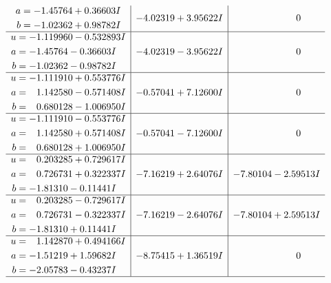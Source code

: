 \documentclass[1p]{elsarticle_modified}
\theoremstyle{definition}
\begin{document}
$$\begin{array}{c|c|c}
\begin{aligned}
a &= -1.45764 + 0.36603 I \\
b &= -1.02362 + 0.98782 I\end{aligned}
 & -4.02319 + 3.95622 I & \phantom{-0.000000 } 0 \\ \hline\begin{aligned}
u &= -1.119960 - 0.532893 I \\
a &= -1.45764 - 0.36603 I \\
b &= -1.02362 - 0.98782 I\end{aligned}
 & -4.02319 - 3.95622 I & \phantom{-0.000000 } 0 \\ \hline\begin{aligned}
u &= -1.111910 + 0.553776 I \\
a &= \phantom{-}1.142580 - 0.571408 I \\
b &= \phantom{-}0.680128 - 1.006950 I\end{aligned}
 & -0.57041 + 7.12600 I & \phantom{-0.000000 } 0 \\ \hline\begin{aligned}
u &= -1.111910 - 0.553776 I \\
a &= \phantom{-}1.142580 + 0.571408 I \\
b &= \phantom{-}0.680128 + 1.006950 I\end{aligned}
 & -0.57041 - 7.12600 I & \phantom{-0.000000 } 0 \\ \hline\begin{aligned}
u &= \phantom{-}0.203285 + 0.729617 I \\
a &= \phantom{-}0.726731 + 0.322337 I \\
b &= -1.81310 - 0.11441 I\end{aligned}
 & -7.16219 + 2.64076 I & -7.80104 - 2.59513 I \\ \hline\begin{aligned}
u &= \phantom{-}0.203285 - 0.729617 I \\
a &= \phantom{-}0.726731 - 0.322337 I \\
b &= -1.81310 + 0.11441 I\end{aligned}
 & -7.16219 - 2.64076 I & -7.80104 + 2.59513 I \\ \hline\begin{aligned}
u &= \phantom{-}1.142870 + 0.494166 I \\
a &= -1.51219 + 1.59682 I \\
b &= -2.05783 - 0.43237 I\end{aligned}
 & -8.75415 + 1.36519 I & \phantom{-0.000000 } 0\\
 \hline 
 \end{array}$$\newpage$$\begin{array}{c|c|c}  

\end{array}$$
\end{document}

